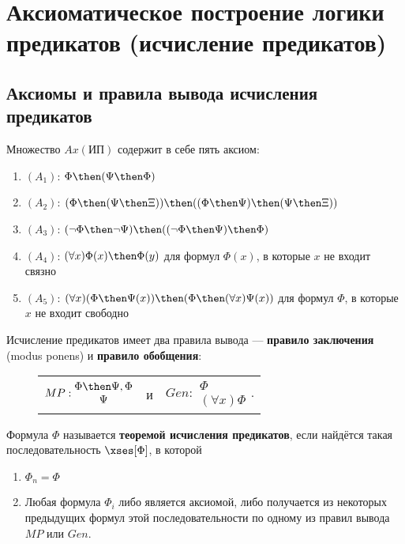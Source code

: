\section{Аксиоматическое построение логики предикатов (исчисление предикатов)}
\subsection{Аксиомы и правила вывода исчисления предикатов}
Множество $Ax(\text{ИП})$ содержит в себе пять аксиом:

\begin{enumerate}
    \item $(A_1)$: $\Phi \then (\Psi \then \Phi)$
    \item $(A_2)$: $(\Phi \then (\Psi \then \Xi)) \then ((\Phi \then \Psi) \then (\Psi \then \Xi))$
    \item $(A_3)$: $(\lnot \Phi \then \lnot \Psi) \then ((\lnot \Phi \then \Psi) \then \Phi)$
    \item $(A_4)$: $(\forall x)\Phi(x) \then \Phi(y)$ для формул $\Phi(x)$, в которые $x$ не входит связно
    \item $(A_5)$: $(\forall x)(\Phi \then \Psi(x)) \then (\Phi \then (\forall x)\Psi(x))$ для формул $\Phi$, в которые $x$ не входит свободно
\end{enumerate}

Исчисление предикатов имеет два правила вывода --- \textbf{правило заключения} (modus ponens) и \textbf{правило обобщения}:

\begin{figure}[H]
    \centering
    \begin{tabular*}{0.5\textwidth}{@{\extracolsep{\fill}}ccc@{}}
        $MP: \begin{matrix}
            \Phi \then \Psi, \Phi \\
            \Psi
        \end{matrix}$ &
        и &
        $Gen: \begin{matrix}
            \Phi \\
            (\forall x)\Phi
        \end{matrix}$.
    \end{tabular*}
\end{figure}

\dftion Формула $\Phi$ называется \textbf{теоремой исчисления предикатов}, если найдётся такая последовательность $\xses[\Phi]$, в которой

\begin{enumerate}
    \item $\Phi_n = \Phi$
    \item Любая формула $\Phi_i$ либо является аксиомой, либо получается из некоторых предыдущих формул этой последовательности по одному из правил вывода $MP$ или $Gen$.
\end{enumerate}

